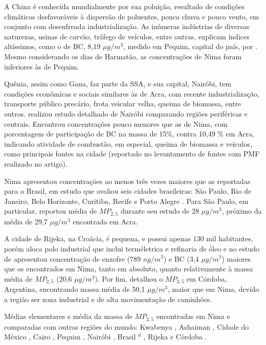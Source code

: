 A China é conhecida mundialmente por sua poluição, resultado de condições
climáticas desfavoráveis à dispersão de poluentes, pouca chuva e pouco vento, 
em conjunto com desenfreada industrialização. As inúmeras indústrias
de diversas naturezas, usinas de carvão, tráfego de veículos, entre outras, 
explicam índices altíssimos, como o de BC, 8,19 $\mu g/m^3$, 
medido em Pequim, capital do país, por \citet{yang2011}. Mesmo considerando 
os dias de Harmatão, as concentrações de Nima foram inferiores às de Pequim.

Quênia, assim como Gana, faz parte da SSA, e sua capital, Nairóbi, tem condições
econômicas e sociais similares às de Acra, com recente industrialização, 
transporte público precário, frota veicular velha, queima de biomassa, 
entre outros.  
\citet{gaita2014} realizou estudo detalhado de Nairóbi comparando regiões 
periféricas e centrais. Encontrou concentrações pouco menores que as de Nima, 
com porcentagem de participação de BC na massa de 15\%, contra 10,49 \% em Acra,
indicando atividade de combustão, em especial, queima de biomassa e veículos, 
como principais fontes na cidade 
(reportado no levantamento de fontes com PMF realizado no artigo). 

Nima apresentou concentrações ao menos três vezes maiores que as reportadas 
para o Brasil, em estudo que avaliou seis cidades brasileiras: São Paulo, 
Rio de Janeiro, Belo Horizonte, Curitiba, Recife e Porto Alegre
\citep{andrade2012urban}. Para São Paulo, em particular, \citet{andrade2012}
reportou média de $MP_{2,5}$ durante seu estudo de 28 $\mu g / m^3$, 
próximo da média de 29,7 $\mu g / m^3$ encontrada em Acra. 

A cidade de Rijeka, na Croácia, é pequena, e possui apenas 130 mil habitantes, 
porém aloca polo industrial que inclui terméletrica e refinaria de óleo
e no estudo de \citet{ivovsevic2015} apresentou concentração de enxofre
(789 $ng / m^3$) e BC (3,4 $\mu g / m^3$) maiores que os encontrados em Nima, 
tanto em absoluto, quanto relativamente à massa média de $MP_{2,5}$ 
(20,6 $\mu g / m^3$). 
Por fim, \citet{achad2014} detalhou o $MP_{2,5}$ em Córdoba, Argentina, 
encontrando massa média de 50,1 $\mu g / m^3$, maior que em Nima, devido a 
região ser zona industrial e de alta movimentação de caminhões.   

\begin{landscape}
  \begin{table}[H]
    \centering
    
    \caption{Médias elementares e média da massa de $MP_{2,5}$ encontradas
             em Nima e comparadas com outras regiões do mundo:
             Kwabenya \citep{aboh2009},
             Ashaiman \citep{ofosu2012},
             Cidade do México \citep{diaz2014},
             Cairo  \citep{boman2013},
             Pequim  \citep{yang2011},
             Nairóbi   \citep{gaita2014},
             Brasil $^d$ \citep{andrade2012urban},
             Rijeka  \citep{ivovsevic2015} e
             Córdoba \citep{achad2014}.
             \label{table:fino_in_the_world}}
  \end{table} 
\end{landscape}

